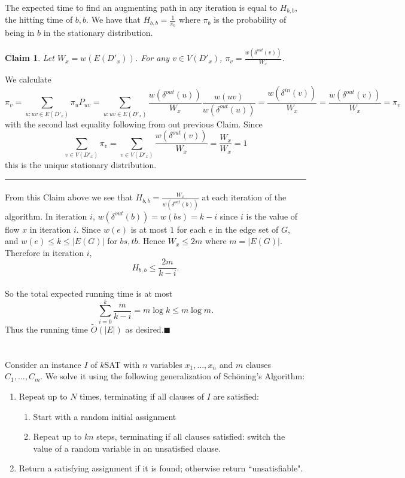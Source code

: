 \documentclass[letterpaper,12pt,oneside,onecolumn]{article}
\newenvironment{proof}{{\bf Proof:  }}{\hfill\rule{2mm}{2mm}}
\newtheorem{claim}[fact]{Claim}
\begin{document}
\paragraph{}
The expected time to find an augmenting path in any iteration is equal to $H_{b,b}$, the hitting time of $b,b$. We have that $H_{b,b} = \frac{1}{\pi_b}$ where $\pi_b$ is the probability of being in $b$ in the stationary distribution.
\begin{claim}
	Let $W_x = w(E(D'_x))$. For any $v \in V(D'_x)$, $\pi_v = \frac{w(\delta^{out}(v))}{W_x}$.
\end{claim}
\begin{proof}
	We calculate
	$$\pi_v = \sum_{u: uv \in E(D'_x)} \pi_uP_{uv} = \sum_{u:uv \in E(D'_x)} \frac{w(\delta^{out}(u))}{W_x}\frac{w(uv)}{w(\delta^{out}(u))} = \frac{w(\delta^{in}(v))}{W_x} = \frac{w(\delta^{out}(v))}{W_x} = \pi_v$$
	with the second last equality following from out previous Claim. Since 
	$$\sum_{v \in V(D'_x)} \pi_v = \sum_{v\in V(D'_x)} \frac{w(\delta^{out}(v))}{W_x} = \frac{W_x}{W_x} = 1$$
	this is the unique stationary distribution.
\end{proof}
\paragraph{}
From this Claim above we see that $H_{b,b} = \frac{W_x}{w(\delta^{out}(b))}$ at each iteration of the algorithm.
In iteration $i$, $w(\delta^{out}(b)) = w(bs) = k-i$ since $i$ is the value of flow $x$ in iteration $i$. Since $w(e)$ is at most $1$ for each $e$ in the edge set of $G$, and $w(e) \leq k\leq |E(G)|$ for $bs, tb$. Hence $W_x \leq 2m$ where $m = |E(G)|$. Therefore in iteration $i$,
$$H_{b,b} \leq \frac{2m}{k-i}.$$
\paragraph{}
So the total expected running time is at most
$$\sum_{i=0}^k\frac{m}{k-i} = m\log k \leq m\log m.$$
Thus the running time $\tilde{O}(|E|)$ as desired.$\blacksquare$
\newpage
\section{}
\paragraph{}
Consider an instance $I$ of $k$SAT with $n$ variables $x_1,\dots,x_n$ and $m$ clauses $C_1, \dots, C_m$. We solve it using the following generalization of Sch\"oning's Algorithm:
\begin{enumerate}
	\item Repeat up to $N$ times, terminating if all clauses of $I$ are satisfied:
	\begin{enumerate}
		\item Start with a random initial assignment
		\item Repeat up to $kn$ steps, terminating if all clauses satisfied: switch the value of a random variable in an unsatisfied clause.
	\end{enumerate}
	\item Return a satisfying assignment if it is found; otherwise return ``unsatisfiable".
\end{enumerate}
\end{document}
